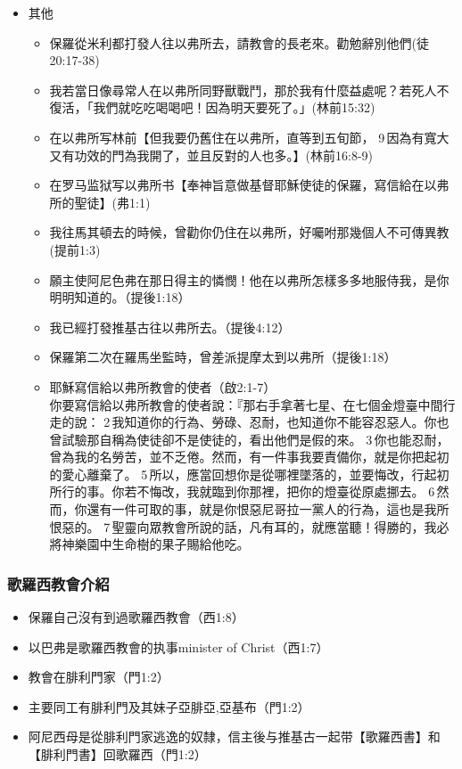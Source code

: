 \begin{itemize}
\item 其他
\begin{itemize}
\itemsep-.25em 
\item 保羅從米利都打發人往以弗所去，請教會的長老來。勸勉辭別他們(徒20:17-38)
\item 我若當日像尋常人在以弗所同野獸戰鬥，那於我有什麼益處呢？若死人不復活，「我們就吃吃喝喝吧！因為明天要死了。」(林前15:32)
\item 在以弗所写林前【但我要仍舊住在以弗所，直等到五旬節， 9 因為有寬大又有功效的門為我開了，並且反對的人也多。】(林前16:8-9)
\item 在罗马监狱写以弗所书【奉神旨意做基督耶穌使徒的保羅，寫信給在以弗所的聖徒】(弗1:1)
\item 我往馬其頓去的時候，曾勸你仍住在以弗所，好囑咐那幾個人不可傳異教(提前1:3)
\item 願主使阿尼色弗在那日得主的憐憫！他在以弗所怎樣多多地服侍我，是你明明知道的。（提後1:18）
\item 我已經打發推基古往以弗所去。（提後4:12）
\item 保羅第二次在羅馬坐監時，曾差派提摩太到以弗所（提後1:18）
\item 耶穌寫信給以弗所教會的使者（啟2:1-7）\\
你要寫信給以弗所教會的使者說：『那右手拿著七星、在七個金燈臺中間行走的說： 2 我知道你的行為、勞碌、忍耐，也知道你不能容忍惡人。你也曾試驗那自稱為使徒卻不是使徒的，看出他們是假的來。 3 你也能忍耐，曾為我的名勞苦，並不乏倦。然而，有一件事我要責備你，就是你把起初的愛心離棄了。 5 所以，應當回想你是從哪裡墜落的，並要悔改，行起初所行的事。你若不悔改，我就臨到你那裡，把你的燈臺從原處挪去。 6 然而，你還有一件可取的事，就是你恨惡尼哥拉一黨人的行為，這也是我所恨惡的。 7 聖靈向眾教會所說的話，凡有耳的，就應當聽！得勝的，我必將神樂園中生命樹的果子賜給他吃。
\end{itemize}
\end{itemize}




\subsubsection{歌羅西教會介紹}

\begin{itemize}%
\itemsep-.15em 
\item 保羅自己沒有到過歌羅西教會（西1:8）
\item 以巴弗是歌羅西教會的执事minister of Christ（西1:7）
\item 教會在腓利門家（門1:2）
\item 主要同工有腓利門及其妹子亞腓亞,亞基布（門1:2）
\item 阿尼西母是從腓利門家逃逸的奴隸，信主後与推基古一起带【歌羅西書】和【腓利門書】回歌羅西（門1:2）
\end{itemize}




